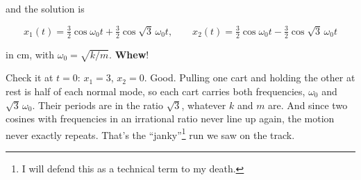\documentclass[12pt]{article}
\numberwithin{equation}{section}
\newcommand{\wo}{\omega_0}
\begin{document}
\noindent and the solution is

\begin{equation}
  \label{eq:answer}
  \boxed{\;x_1(t) = \tfrac{3}{2}\cos\wo t + \tfrac{3}{2}\cos\sqrt{3}\,\wo t,
  \qquad
  x_2(t) = \tfrac{3}{2}\cos\wo t - \tfrac{3}{2}\cos\sqrt{3}\,\wo t\;}
\end{equation}

\noindent in cm, with $\wo = \sqrt{k/m}$. \textbf{Whew}!

Check it at $t = 0$: $x_1 = 3$, $x_2 = 0$. Good. Pulling one cart and
holding the other at rest is half of each normal mode, so each cart
carries both frequencies, $\wo$ and $\sqrt{3}\,\wo$. Their periods are in
the ratio $\sqrt{3}$, whatever $k$ and $m$ are. And since two cosines
with frequencies in an irrational ratio never line up again, the motion
never exactly repeats. That's the ``janky''\footnote{I will defend this as a
  technical term to my death.} run we saw on the track.
\end{document}
